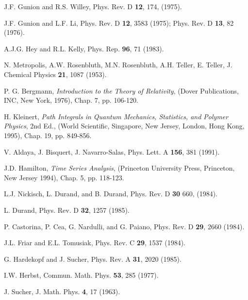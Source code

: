 \begin{thebibliography}{99}

   J.F. Gunion and R.S. Willey,
{Phys. Rev. D} {\bf 12}, 174, (1975).

   J.F. Gunion and L.F. Li, 
{Phys. Rev. D} {\bf 12}, 3583 (1975);
{Phys. Rev. D} {\bf 13}, 82 (1976).

   A.J.G. Hey and R.L. Kelly,
{Phys. Rep.} {\bf 96}, 71 (1983).

   N. Metropolis, A.W. Rosenbluth, M.N. Rosenbluth, A.H. Teller,
E. Teller,
{J. Chemical Physics} {\bf 21}, 1087 (1953).

   P. G. Bergmann, {\it Introduction to the Theory of Relativity}, 
(Dover Publications, INC, New York, 1976), Chap. 7, pp. 106-120.

   H. Kleinert, {\it Path Integrals in Quantum Mechanics, Statistics,
                     and Polymer Phys\-ics}, 2nd Ed., 
(World Scientific, Singapore, New Jersey, London, Hong Kong, 1995), 
Chap. 19, pp. 849-856.

   V. Aldaya, J. Bisquert, J. Navarro-Salas, 
{Phys. Lett. A} {\bf 156}, 381 (1991).

   J.D. Hamilton, {\it Time Series Analysis}, 
(Princeton University Press, Princeton, New Jersey 1994), 
Chap. 5, pp. 118-123.

L.J. Nickisch, L. Durand, and
B. Durand, {Phys. Rev. D} {\bf 30} 660, (1984).

L. Durand, {Phys. Rev. D} {\bf 32}, 1257 (1985).

P. Castorina, P. Cea, G. Nardulli, and G. Paiano,
{Phys. Rev. D} {\bf 29}, 2660 (1984).

J.L. Friar and E.L. Tomusiak,
{Phys. Rev. C} {\bf 29}, 1537 (1984).

G. Hardekopf and J. Sucher, {Phys. Rev. A} {\bf 31}, 2020 (1985).

I.W. Herbst, {Commun. Math. Phys.} {\bf 53}, 285 (1977).

J. Sucher, {J. Math. Phys.} {\bf 4}, 17 (1963).
\end{thebibliography}


\newpage
\pagestyle{empty}

